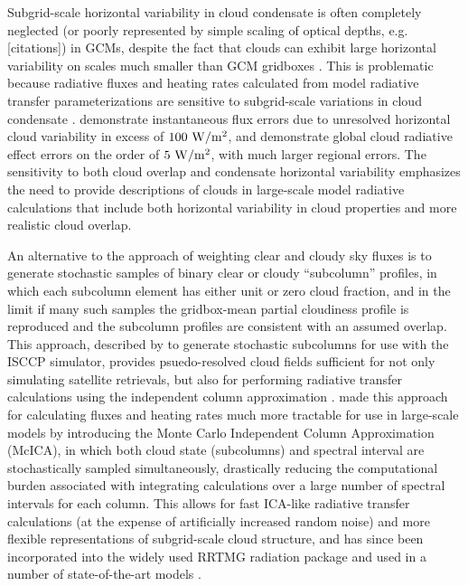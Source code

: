Subgrid-scale horizontal variability in cloud condensate is often completely neglected (or poorly represented by simple scaling of optical depths, e.g. [citations]) in GCMs, despite the fact that clouds can exhibit large horizontal variability on scales much smaller than GCM gridboxes \citep[e.g.,][]{stephens_and_platt_1987}. This is problematic because radiative fluxes and heating rates calculated from model radiative transfer parameterizations are sensitive to subgrid-scale variations in cloud condensate \citep[e.g.,][]{barker_et_al_1999,wu_and_liang_2005,oreopoulos_et_al_2012}. \cite{barker_et_al_1999} demonstrate instantaneous flux errors due to unresolved horizontal cloud variability in excess of $100 ~{\rm W}/{\rm m}^2$, and \cite{oreopoulos_et_al_2012} demonstrate global cloud radiative effect errors on the order of $5 ~{\rm W}/{\rm m}^2$, with much larger regional errors. The sensitivity to both cloud overlap and condensate horizontal variability emphasizes the need to provide descriptions of clouds in large-scale model radiative calculations that include both horizontal variability in cloud properties and more realistic cloud overlap.

An alternative to the approach of weighting clear and cloudy sky fluxes is to generate stochastic samples of binary clear or cloudy ``subcolumn'' profiles, in which each subcolumn element has either unit or zero cloud fraction, and in the limit if many  such samples the gridbox-mean partial cloudiness profile is reproduced and the subcolumn profiles are consistent with an assumed overlap. This approach, described by \cite{klein_and_jakob_1999} to generate stochastic subcolumns for use with the ISCCP simulator, provides psuedo-resolved cloud fields sufficient for not only simulating satellite retrievals, but also for performing radiative transfer calculations using the independent column approximation \citep[ICA;][]{cahalan_et_al_1994}. \cite{pincus_et_al_2003} made this approach for calculating fluxes and heating rates much more tractable for use in large-scale models by introducing the Monte Carlo Independent Column Approximation (McICA), in which both cloud state (subcolumns) and spectral interval are stochastically sampled simultaneously, drastically reducing the computational burden associated with integrating calculations over a large number of spectral intervals for each column. This allows for fast ICA-like radiative transfer calculations (at the expense of artificially increased random noise) and more flexible representations of subgrid-scale cloud structure, and has since been incorporated into the widely used RRTMG radiation package and used in a number of state-of-the-art models \citep{iacono_et_al_2008, von_salzen_et_al_2012, neale_et_al_2010a, neale_et_al_2010b, donner_et_al_2011, hogan_et_al_2014}.

